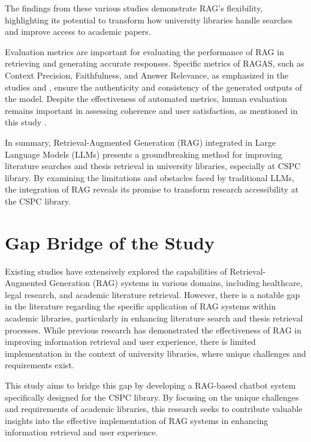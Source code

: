 \begin{refsection}
\newpage
\clearpage
The findings from these various studies demonstrate RAG's flexibility, highlighting its potential to transform how university libraries handle searches and improve access to academic papers.

\hspace{0.4cm}Evaluation metrics are important for evaluating the performance of RAG in retrieving and generating accurate responses. Specific metrics of RAGAS, such as Context Precision, Faithfulness, and Answer Relevance, as emphasized in the studies \cite{sagi2024genai} and \cite{arzideh2024miracle}, ensure the authenticity and consistency of the generated outputs of the model. Despite the effectiveness of automated metrics, human evaluation remains important in assessing coherence and user satisfaction, as mentioned in this study \cite{aquino2024extracting}.

\hspace{0.4cm} In summary, Retrieval-Augmented Generation (RAG) integrated in Large Language Models (LLMs) presents a groundbreaking method for improving literature searches and thesis retrieval in university libraries, especially at CSPC library. By examining the limitations and obstacles faced by traditional LLMs, the integration of RAG reveals its promise to transform research accessibility at the CSPC library.

\section{Gap Bridge of the Study}


\hspace{0.4cm}Existing studies have extensively explored the capabilities of Retrieval-Augmented Generation (RAG) systems in various domains, including healthcare, legal research, and academic literature retrieval. However, there is a notable gap in the literature regarding the specific application of RAG systems within academic libraries, particularly in enhancing literature search and thesis retrieval processes. While previous research has demonstrated the effectiveness of RAG in improving information retrieval and user experience, there is limited implementation in the context of university libraries, where unique challenges and requirements exist.

\hspace{0.4cm}This study aims to bridge this gap by developing a RAG-based chatbot system specifically designed for the CSPC library. By focusing on the unique challenges and requirements of academic libraries, this research seeks to contribute valuable insights into the effective implementation of RAG systems in enhancing information retrieval and user experience.


\clearpage

\printbibliography[heading=subbibintoc, title={\centering Notes}]
\end{refsection}
